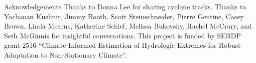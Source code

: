\begin{block}{Acknowledgements}
    Thanks to Donna Lee for sharing cyclone tracks.
    Thanks to Yochanan Kushnir, Jimmy Booth, Scott Steinschneider, Pierre Gentine, Casey Brown, Linda Mearns, Katherine Schlef, Melissa Bukovsky, Rachel McCrary, and Seth McGinnis for insightful conversations.
    This project is funded by SERDP grant 2516 ``Climate Informed Estimation of Hydrologic Extremes for Robust Adaptation to Non-Stationary Climate''.
\end{block}
